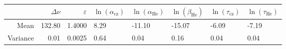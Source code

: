 \begin{tabular}{r|rr}
\toprule
 & $\Delta\nu$ & $\varepsilon$ & $\ln(\alpha_\mathrm{cz})$ & $\ln(\alpha_\mathrm{He})$ & $\ln(\beta_\mathrm{He})$ & $\ln(\tau_\mathrm{cz})$ & $\ln(\tau_\mathrm{He})$ \\
\midrule
Mean & 132.80 & 1.4000 & 8.29 & -11.10 & -15.07 & -6.09 & -7.19 \\
Variance & 0.01 & 0.0025 & 0.64 & 0.04 & 0.16 & 0.04 & 0.04 \\
\bottomrule
\end{tabular}

